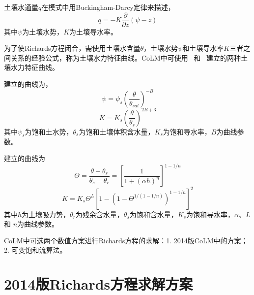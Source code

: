 土壤水通量$q$在模式中用Buckingham-Darcy定律来描述，
\begin{equation}
q=-K \frac{\partial}{\partial z}(\psi-z)
\end{equation}
其中$\psi$为土壤水势，$K$为土壤导水率。

为了使Richards方程闭合，需使用土壤水含量$\theta$，土壤水势$\psi$和土壤导水率$K$三者之间关系的经验公式，称为土壤水力特征曲线。CoLM中可使用~\citet{campbell1974} 和~\citet{van1980closed} 建立的两种土壤水力特征曲线。

\citet{campbell1974}建立的曲线为，
\begin{equation}\label{eq:SW_CB}
\psi=\psi_{s}\left(\frac{\theta}{\theta_{sat}}\right)^{-B}
\end{equation}
\begin{equation}\label{eq:Ks_CB}
K=K_{s}\left(\frac{\theta}{\theta_{s}}\right)^{2 B+3}
\end{equation}
其中$\psi_s$为饱和土水势，$\theta_{s}$为饱和土壤体积含水量，$K_{s}$为饱和导水率，$B$为曲线参数。

\citet{van1980closed} 建立的曲线为
\begin{equation}\label{eq:SW_VG}
    \Theta = \frac{\theta-\theta_r}{\theta_s-\theta_r} = \left[\frac{1}{1+\left(\alpha h\right)^n}\right]^{1-1/n}
\end{equation}
\begin{equation}\label{eq:Ks_VG}
    K = K_s \Theta^L \left[1-\left(1-\Theta^{1/\left(1-1/n\right)}\right)^{1-1/n}\right]^2
\end{equation}
其中$h$为土壤吸力势，$\theta_r$为残余含水量，$\theta_s$为饱和含水量，$K_{s}$为饱和导水率，$\alpha$、$L$ 和 $n$为曲线参数。

CoLM中可选两个数值方案进行Richards方程的求解：1. 2014版CoLM中的方案；2. 可变饱和流算法。

\section{2014版Richards方程求解方案}

